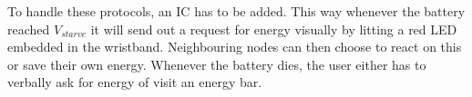 
To handle these protocols, an IC has to be added. This way whenever the battery reached $V_{starve}$ it will send out a request for energy visually by litting a red LED embedded in the wristband. Neighbouring nodes can then choose to react on this or save their own energy. Whenever the battery dies, the user either has to verbally ask for energy of visit an energy bar.


